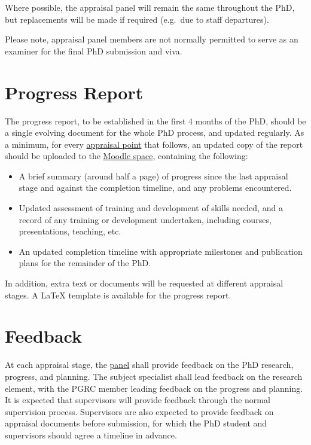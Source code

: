 \documentclass[12pt,a4paper]{article}
\begin{document}
Where possible, the appraisal panel will remain the same throughout the PhD, but replacements will be made if required (e.g.\ due to staff departures).

Please note, appraisal panel members are not normally permitted to serve as an examiner for the final PhD submission and viva.

\section{Progress Report} \label{sec:report}
The progress report, to be established in the first 4 months of the PhD, should be a single evolving document for the whole PhD process, and updated regularly. As a minimum, for every \hyperref[sec:points]{appraisal point} that follows, an updated copy of the report should be uploaded to the \href{https://modules.lancaster.ac.uk/course/view.php?id=7050}{Moodle space}, containing the following:
\begin{itemize}
	\item A brief summary (around half a page) of progress since the last appraisal stage and against the completion timeline, and any problems encountered.
	\item Updated assessment of training and development of skills needed, and a record of any training or development undertaken, including courses, presentations, teaching, etc.\
	\item An updated completion timeline with appropriate milestones and publication plans for the remainder of the PhD.
\end{itemize}

In addition, extra text or documents will be requested at different appraisal stages. A \LaTeX{} template is available for the progress report.


\section{Feedback} \label{sec:feedback}
At each appraisal stage, the \hyperref[sec:panel]{panel} shall provide feedback on the PhD research, progress, and planning. The subject specialist shall lead feedback on the research element, with the PGRC member leading feedback on the progress and planning. It is expected that supervisors will provide feedback through the normal supervision process. Supervisors are also expected to provide feedback on appraisal documents before submission, for which the PhD student and supervisors should agree a timeline in advance.
\end{document}
